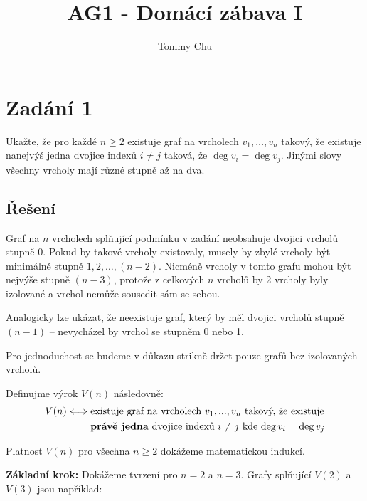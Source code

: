 \documentclass{article}
\title{AG1 - Domácí zábava I}
\author{Tommy Chu}
\date{}
\begin{document}
\maketitle

\section*{Zadání 1}

Ukažte, že pro každé $n \ge 2$ existuje graf na vrcholech $v_1, \dots, v_n$ takový, že existuje nanejvýš jedna dvojice indexů $i \ne j$ taková, že $\deg v_i = \deg v_j$. Jinými slovy všechny vrcholy mají různé stupně až na dva.

\subsection*{Řešení}

Graf na $n$ vrcholech splňující podmínku v zadání neobsahuje dvojici vrcholů stupně 0. Pokud by takové vrcholy existovaly, musely by zbylé vrcholy být minimálně stupně $1, 2, \dots, (n-2)$. Nicméně vrcholy v tomto grafu mohou být nejvýše stupně $(n-3)$, protože z celkových $n$ vrcholů by 2 vrcholy byly izolované a vrchol nemůže sousedit sám se sebou.

Analogicky lze ukázat, že neexistuje graf, který by měl dvojici vrcholů stupně $(n-1)$ -- nevycházel by vrchol se stupněm 0 nebo 1.

Pro jednoduchost se budeme v důkazu strikně držet pouze grafů bez izolovaných vrcholů.

Definujme výrok $V(n)$ následovně:
\begin{align*}
    V(n) \Longleftrightarrow \;
     & \text{existuje graf na vrcholech $v_1, . . . , v_n$ takový, že existuje}       \\
     & \text{\textbf{právě jedna} dvojice indexů $i \ne j$ kde $\deg v_i = \deg v_j$}
\end{align*}

Platnost $V(n)$ pro všechna $n \ge 2$ dokážeme matematickou indukcí.

\textbf{Základní krok:} Dokážeme tvrzení pro $n = 2$ a $n = 3$. Grafy splňující $V(2)$ a $V(3)$ jsou například:

\begin{center}
    \qquad
\end{center}
\end{document}
